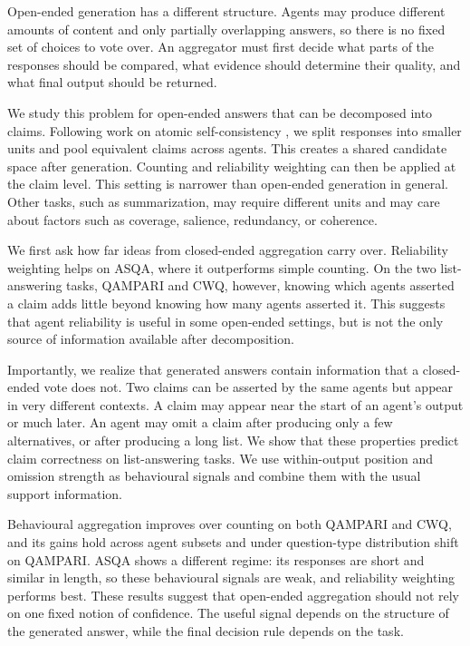 \documentclass{article}
\begin{document}
Open-ended generation has a different structure. Agents may produce different amounts of content and only partially overlapping answers, so there is no fixed set of choices to vote over. An aggregator must first decide what parts of the responses should be compared, what evidence should determine their quality, and what final output should be returned.

We study this problem for open-ended answers that can be decomposed into claims. Following work on atomic self-consistency \cite{thirukovalluru2024atomic}, we split responses into smaller units and pool equivalent claims across agents. This creates a shared candidate space after generation. Counting and reliability weighting can then be applied at the claim level. This setting is narrower than open-ended generation in general. Other tasks, such as summarization, may require different units and may care about factors such as coverage, salience, redundancy, or coherence.

We first ask how far ideas from closed-ended aggregation carry over. Reliability weighting helps on ASQA, where it outperforms simple counting. On the two list-answering tasks, QAMPARI and CWQ, however, knowing which agents asserted a claim adds little beyond knowing how many agents asserted it. This suggests that agent reliability is useful in some open-ended settings, but is not the only source of information available after decomposition.

Importantly, we realize that generated answers contain information that a closed-ended vote does not. Two claims can be asserted by the same agents but appear in very different contexts. A claim may appear near the start of an agent's output or much later. An agent may omit a claim after producing only a few alternatives, or after producing a long list. We show that these properties predict claim correctness on list-answering tasks. We use within-output position and omission strength as behavioural signals and combine them with the usual support information.

Behavioural aggregation improves over counting on both QAMPARI and CWQ, and its gains hold across agent subsets and under question-type distribution shift on QAMPARI. ASQA shows a different regime: its responses are short and similar in length, so these behavioural signals are weak, and reliability weighting performs best. These results suggest that open-ended aggregation should not rely on one fixed notion of confidence. The useful signal depends on the structure of the generated answer, while the final decision rule depends on the task.
\end{document}
